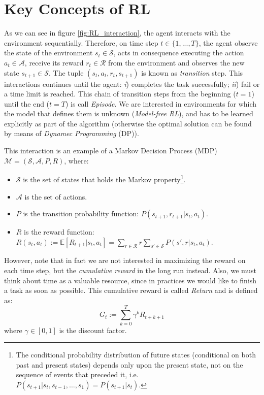 \documentclass[twoside,twocolumn]{article}
\begin{document}

\section{Key Concepts of RL}

As we can see in figure \ref{fig:RL_interaction}, the agent interacts with the environment sequentially. Therefore, on time step $t \in \{1,...,T\}$, the agent observe the state of the environment $s_t \in \mathcal{S}$, acts in consequence executing the action $a_t \in \mathcal{A}$, receive its reward $r_t \in \mathcal{R}$ from the environment and observes the new state $s_{t+1} \in \mathcal{S}$.
The tuple $(s_t, a_t, r_t, s_{t+1})$ is known as \emph{transition} step.
This interactions continues until the agent: \textit{i}) completes the task successfully; \textit{ii}) fail or a time limit is reached. This chain of transition steps from the beginning ($t=1$) until the end ($t=T$) is call \emph{Episode}.
We are interested in environments for which the model that defines them is unknown (\emph{Model-free RL}), and has to be learned explicitly as part of the algorithm (otherwise the optimal solution can be found by means of \emph{Dynamec Programming} (DP)).

\noindent This interaction  is an example of a Markov Decision Process (MDP)\cite{Sutton1998} $\mathcal{M}=(\mathcal{S}, \mathcal{A}, P, R)$, where:

\begin{itemize}
    \item $\mathcal{S}$ is the set of states that holds the Markov property\footnote{The conditional probability distribution of future states (conditional on both past and present states) depends only upon the present state, not on the sequence of events that preceded it, i.e. $P(s_{t+1}|s_{t}, s_{t-1},\dots, s_1)=P(s_{t+1}|s_{t})$.}.
    \item $\mathcal{A}$ is the set of actions.
    \item $P$ is the transition probability function: $P(s_{t+1},r_{t+1}|s_t, a_t)$.
    \item $R$ is the reward function: $R(s_t, a_t):=\mathbb{E}[R_{t+1}|s_t,a_t]=\sum_{r\in \mathcal{R}}r \sum_{s' \in \mathcal{S}}P(s',r|s_t, a_t)$.
\end{itemize}

However, note that in fact we are not interested in maximizing the reward on each time step, but the \emph{cumulative reward} in the long run instead. Also, we must think about time as a valuable resource, since in practices we would like to finish a task as soon as possible. This cumulative reward is called \emph{Return} and is defined as:
\begin{equation}
  G_t := \sum_{k=0}^T \gamma^k R_{t+k+1}
\end{equation}
where $\gamma \in [0,1]$ is the discount factor.
\end{document}
